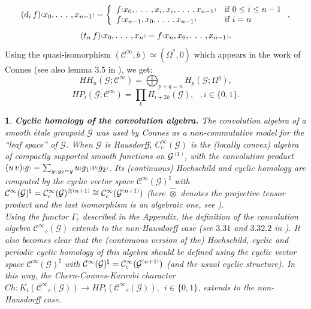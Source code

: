 \documentclass[a4paper]{article}
\newtheorem{num}[st]{}
\newcommand{\rmap}{\longrightarrow}
\newcommand{\G}{\ensuremath{\mathcal{G}}}
\newcommand{\C}{\ensuremath{\mathcal{C}}}
\newcommand{\cii}{\ensuremath{\C^{\infty}}}
\newcommand{\ps}{{\raise 1pt\hbox{\tiny (}}}
\newcommand{\pd}{{\raise 1pt\hbox{\tiny )}}}
\newcommand{\nG}[1]{\ensuremath{\G^{\,\ps #1\,\pd}}}
\begin{document}
\[ (d_i\, f)\ps x_0, .\ .\ .\ , x_{n- 1}\pd = \left\{ \begin{array}{ll}
                                                       f\ps x_0, .\ .\ .\ , x_i, x_i, .\ .\ .\ , x_{n- 1}\pd & \mbox{if $0 \leq i \leq n-1$} \\
                                                       f\ps x_{n- 1}, x_0, .\ .\ .\ , x_{n- 1}\pd & \mbox{if $i=n$}
                                                \end{array}
                                        \right. ,\]
\[ (t_n\, f)\ps x_0, .\ .\ .\ , x_n\pd = f\ps x_n, x_0, .\ .\ .\ , x_{n- 1}\pd .\]
Using the quasi-isomorphism $(\cii, b) \simeq (\Omega^*, 0)$ which appears in the work of Connes (see also lemma 3.5 in \cite{Cra}), we get:
\[ HH_{n}(\G; \cii) = \bigoplus_{p+ q= n} H_{p} (\G; \Omega^{q}), \]
\[ HP_{i}(\G; \cii) = \prod_{k} H_{i+ 2k}(\G), \ \ \  , i \in \{ 0, 1\}. \]


\begin{num}
\emph{
{\bf Cyclic homology of the convolution algebra.} The convolution algebra of a smooth \'etale groupoid $\G$ was used by Connes as a non-commutative model for the ``leaf space'' of $\G$. When $\G$ is Hausdorff, $C_{c}^{\infty}(\G)$ is the (locally convex) algebra of compactly supported smooth functions on $\nG{1}$, with the convolution product $(u\, v)\ps g\pd =\sum_{g_1g_2= g} u\ps g_1\pd v\ps g_2\pd $. Its (continuous) Hochschild and cyclic homology are computed by the cyclic vector space $\cii(\G)^{\natural}$ with $\cii(\G)^{\natural}= \cii_c(\G)^{\hat{\otimes}\ps n+ 1\pd} \cong \cii_c(\G^{\ps n+ 1\pd})$ (here $\hat{\otimes}$ denotes the projective tensor product and the last isomorphism is an algebraic one, see \cite{Gr}). \\
\hspace*{.3in} Using the functor $\Gamma_c$ described in the Appendix, the definition of the convolution algebra $\cii_c(\G)$ extends to the non-Hausdorff case (see $3.31$ and $3.32.2$ in \cite{Cra}). It also becomes clear that the (continuous version of the) Hochschild, cyclic and periodic cyclic homology of this algebra should be defined using the cyclic vector space $\cii(\G)^{\natural}$
with $\cii(\G)^{\natural}= \cii_c(\G^{\ps n+ 1\pd})$ (and the usual cyclic structure). In this way, the Chern-Connes-Karoubi character $Ch: K_i (\cii_c(\G)) \rmap HP_i(\cii_c(\G)),\ \ i\in \{ 0, 1\}$, extends to the non-Hausdorff case.
}
\end{num} 
\end{document}
